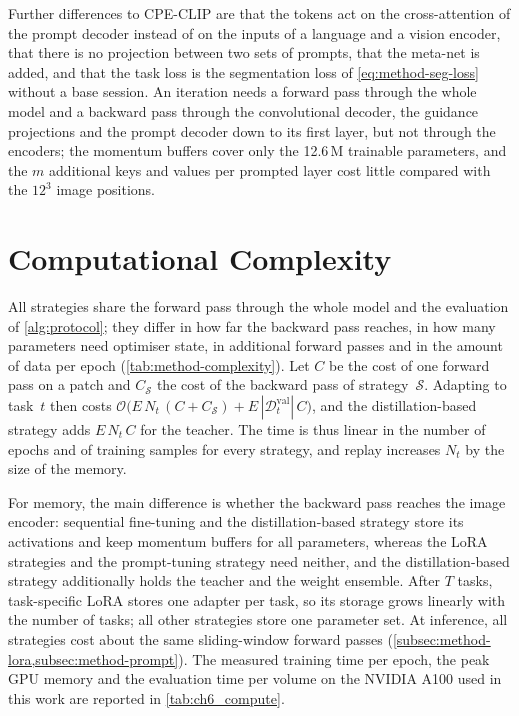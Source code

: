 Further differences to CPE-CLIP are that the tokens act on the cross-attention of the prompt decoder instead of on the inputs of a language and a vision encoder, that there is no projection between two sets of prompts, that the meta-net is added, and that the task loss is the segmentation loss of \cref{eq:method-seg-loss} without a base session.
An iteration needs a forward pass through the whole model and a backward pass through the convolutional decoder, the guidance projections and the prompt decoder down to its first layer, but not through the encoders; the momentum buffers cover only the 12.6\,M trainable parameters, and the $m$ additional keys and values per prompted layer cost little compared with the $12^3$ image positions.

\section{Computational Complexity}
\label{sec:method-complexity}

All strategies share the forward pass through the whole model and the evaluation of \cref{alg:protocol}; they differ in how far the backward pass reaches, in how many parameters need optimiser state, in additional forward passes and in the amount of data per epoch (\cref{tab:method-complexity}).
Let $C$ be the cost of one forward pass on a patch and $C_{\mathcal{S}}$ the cost of the backward pass of strategy~$\mathcal{S}$.
Adapting to task~$t$ then costs $\mathcal{O}\big(E \, N_t \, (C + C_{\mathcal{S}}) + E \, |\mathcal{D}_t^{\mathrm{val}}| \, C\big)$, and the distillation-based strategy adds $E \, N_t \, C$ for the teacher.
The time is thus linear in the number of epochs and of training samples for every strategy, and replay increases $N_t$ by the size of the memory.

For memory, the main difference is whether the backward pass reaches the image encoder: sequential fine-tuning and the distillation-based strategy store its activations and keep momentum buffers for all parameters, whereas the LoRA strategies and the prompt-tuning strategy need neither, and the distillation-based strategy additionally holds the teacher and the weight ensemble.
After $T$ tasks, task-specific LoRA stores one adapter per task, so its storage grows linearly with the number of tasks; all other strategies store one parameter set.
At inference, all strategies cost about the same sliding-window forward passes (\cref{subsec:method-lora,subsec:method-prompt}).
The measured training time per epoch, the peak GPU memory and the evaluation time per volume on the NVIDIA A100 used in this work are reported in \cref{tab:ch6_compute}.

